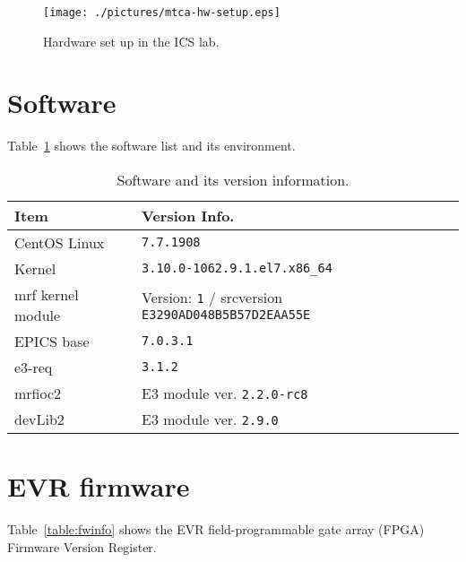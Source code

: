 \documentclass[11pt
  , a4paper
  , article
  , oneside
  , showtrims
]{memoir}
\begin{document}
\begin{figure}[!b]
  \centering
  \texttt{[image: ./pictures/mtca-hw-setup.eps]}
  \caption{Hardware set up in the ICS lab.}
  \label{fig:mtca-hw-setup}
\end{figure}


\section{Software}
Table~\ref{table:swlist} shows the software list and its environment.

\begin{table}[!htb]
  \centering
  \begin{tabular}{l|l}
    \toprule
    Item               & Version Info.                                                       \\\midrule
    CentOS Linux       & \texttt{7.7.1908}                                                  \\\midrule
    Kernel             & \texttt{3.10.0-1062.9.1.el7.x86\_64}                               \\\midrule
    mrf kernel module  & Version: \texttt{1} / srcversion \texttt{E3290AD048B5B57D2EAA55E}  \\\midrule
    EPICS base         & \texttt{7.0.3.1}                                                   \\\midrule
    e3-req             & \texttt{3.1.2}                                                     \\\midrule
    mrfioc2            & E3 module ver. \texttt{2.2.0-rc8}                                  \\\midrule
    devLib2            & E3 module ver. \texttt{2.9.0}                                      \\\bottomrule
  \end{tabular}
  \caption[]{Software and its version information.}
  \label{table:swlist}
\end{table}


\section{EVR firmware}
Table~\ref{table:fwinfo} shows the EVR field-programmable gate array (FPGA) Firmware Version Register.
\end{document}
